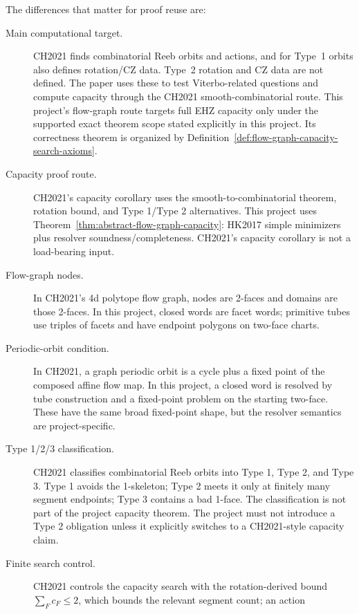 \begin{remark}\label{rem:ch2021-project-comparison}
The differences that matter for proof reuse are:
\begin{description}
  \item[Main computational target.]
    CH2021 finds combinatorial Reeb orbits and actions, and for Type~1 orbits
    also defines rotation/CZ data.  Type~2 rotation and CZ data are not
    defined.  The paper
    uses these to test Viterbo-related questions and compute capacity through
    the CH2021 smooth-combinatorial route.  This project's flow-graph route
    targets full EHZ capacity only under the supported exact theorem scope
    stated explicitly in this project. Its correctness theorem is organized by
    Definition~\ref{def:flow-graph-capacity-search-axioms}.
  \item[Capacity proof route.]
    CH2021's capacity corollary uses the smooth-to-combinatorial theorem,
    rotation bound, and Type 1/Type 2 alternatives.  This project uses
    Theorem~\ref{thm:abstract-flow-graph-capacity}: HK2017 simple minimizers
    plus resolver soundness/completeness.  CH2021's capacity corollary is not a
    load-bearing input.
  \item[Flow-graph nodes.]
    In CH2021's 4d polytope flow graph, nodes are 2-faces and domains are those
    2-faces.  In this project, closed words are facet words; primitive tubes use
    triples of facets and have endpoint polygons on two-face charts.
  \item[Periodic-orbit condition.]
    In CH2021, a graph periodic orbit is a cycle plus a fixed point of the
    composed affine flow map.  In this project, a closed word is resolved by
    tube construction and a fixed-point problem on the starting two-face.  These
    have the same broad fixed-point shape, but the resolver semantics are
    project-specific.
  \item[Type 1/2/3 classification.]
    CH2021 classifies combinatorial Reeb orbits into Type 1, Type 2, and Type
    3.  Type 1 avoids the 1-skeleton; Type 2 meets it only at finitely many
    segment endpoints; Type 3 contains a bad 1-face.  The classification is not
    part of the project capacity theorem.  The project must not introduce a
    Type 2 obligation unless it explicitly switches to a CH2021-style capacity
    claim.
  \item[Finite search control.]
    CH2021 controls the capacity search with the rotation-derived bound
    \(\sum_F c_F\leq2\), which bounds the relevant segment count; an action

\end{description}
\end{remark}
